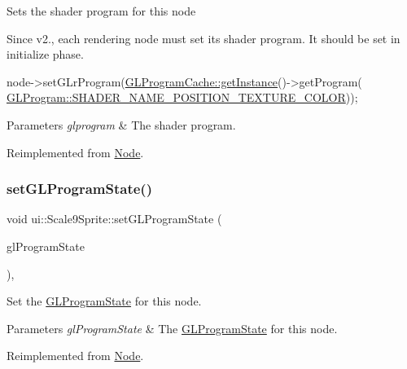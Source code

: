 Sets the shader program for this node

Since v2., each rendering node must set its shader program. It should be set in initialize phase. 
\begin{DoxyCode}
node->setGLrProgram(\hyperlink{classGLProgramCache_a084359da301355ed6c32b12689669d37}{GLProgramCache::getInstance}()->getProgram(
      \hyperlink{classGLProgram_a7f7e223328336e8792add8633171aa96}{GLProgram::SHADER\_NAME\_POSITION\_TEXTURE\_COLOR}));
\end{DoxyCode}



\begin{DoxyParams}{Parameters}
{\em glprogram} & The shader program. \\
\hline
\end{DoxyParams}


Reimplemented from \hyperlink{classNode_a16ac830f1b38ae931da062c0833b2db0}{Node}.

\mbox{\label{classui_1_1Scale9Sprite_ac5d1aa898d17b1417f8d6ac5589d0440}} 
\subsubsection{\texorpdfstring{set\+G\+L\+Program\+State()}{setGLProgramState()}}
{\footnotesize\ttfamily void ui\+::\+Scale9\+Sprite\+::set\+G\+L\+Program\+State (\begin{DoxyParamCaption}\item[{\hyperlink{classGLProgramState}{G\+L\+Program\+State} $\ast$}]{gl\+Program\+State }\end{DoxyParamCaption})\hspace{0.3cm}{\ttfamily [override]}, {\ttfamily [virtual]}}

Set the \hyperlink{classGLProgramState}{G\+L\+Program\+State} for this node.


\begin{DoxyParams}{Parameters}
{\em gl\+Program\+State} & The \hyperlink{classGLProgramState}{G\+L\+Program\+State} for this node. \\
\hline
\end{DoxyParams}


Reimplemented from \hyperlink{classNode_a3fe706d4e7b601eee9ccc8eb8ecf90c0}{Node}.

